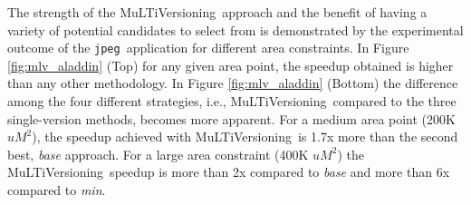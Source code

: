 \documentclass[]{usiinfthesis}
\newcommand{\multi}{MuLTiVersioning}
\newcommand{\jpeg}{\texttt{jpeg}}
\begin{document}

The strength of the \multi\ approach and the benefit of having 
a variety of potential candidates to select from is demonstrated by the experimental 
outcome of the \jpeg\ application for different area constraints. 
In Figure \ref{fig:mlv_aladdin} (Top) for any given area point, the speedup obtained 
is higher than any other methodology. In Figure \ref{fig:mlv_aladdin} (Bottom) the 
difference among the four different strategies, i.e., \multi\ compared to the three 
single-version methods, becomes more apparent. For a medium area point (200K  $uM^2$), 
the speedup achieved with \multi\ is 1.7x more than the second best, \emph{base} approach. 
For a large area constraint (400K $uM^2$) the \multi\ speedup is more than 2x compared to
\emph{base} and more than 6x compared to \emph{min}.\par




\end{document}
